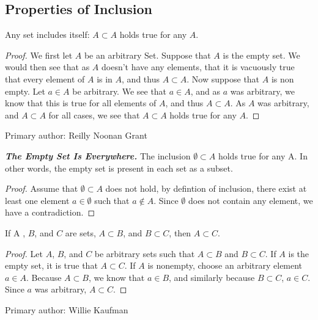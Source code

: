 \subsection{Properties of Inclusion}%
				\begin{majorEx}%
                Any set includes itself: $A \subset A$ holds true for any $A$.
				\end{majorEx}
                \begin{proof}
                  We first let $A$ be an arbitrary Set. Suppose that $A$ is the empty set. We would then see that as $A$ doesn't have any elements, that it is vacuously true that every element of $A$ is in $A$, and thus  $A \subset A$. Now suppose that $A$ is non empty. Let $a \in A$ be arbitrary. We see that $a \in A$, and as $a$ was arbitrary, we know that this is true for all elements of $A$, and thus $A \subset A$. As $A$ was arbitrary, and $A \subset A$ for all cases, we see that $A \subset A$ holds true for any $A$.
                \end{proof}
                Primary author: Reilly Noonan Grant
				\begin{majorEx}%
					\textbf{\textit{The Empty Set Is Everywhere.}} The inclusion $\emptyset \subset A$ holds true for any A. In other words, the empty set is present in each set as a subset.
                    \begin{proof}
                    Assume that $\emptyset \subset A$ does not hold, by defintion of inclusion, there exist at least one element $a \in \emptyset$ such that $a \not\in A$. Since $\emptyset$ does not contain any element, we have a contradiction.
                    \end{proof}
				\end{majorEx}
				\begin{majorEx}%
					If A , $B$, and $C$ are sets, $A \subset B$, and $B \subset C$, then $A \subset C$. 
				\end{majorEx}
                \begin{proof}
                Let $A$, $B$, and $C$ be arbitrary sets such that $A \subset B$ and $B \subset C$. If $A$ is the empty set, it is true that $A \subset C$. If $A$ is nonempty, choose an arbitrary element $a \in A$. Because $A \subset B$, we know that $a \in B$, and similarly because  $B \subset C$, $a \in C$. Since $a$ was arbitrary, $A \subset C$. \newline
                \end{proof}
      		 Primary author: Willie Kaufman
